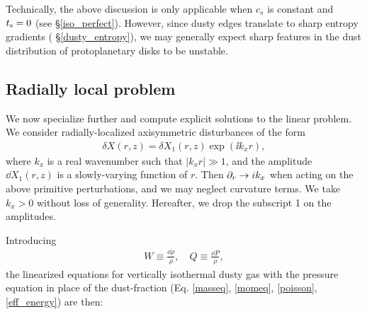Technically, the above discussion is only applicable when $c_s$ is
constant and $t_\mathrm{s}=0$ (see \S\ref{iso_perfect}). However, since
dusty edges translate to sharp entropy gradients (
\S\ref{dusty_entropy}), we may generally expect sharp features in the
dust distribution of protoplanetary disks to be unstable.    



\subsection{Radially local problem}
We now specialize further and compute explicit solutions to the linear
problem. We consider radially-localized axisymmetric disturbances of the form  
\begin{align}
  \delta X (r, z) = \delta X_1(r,z)\exp{(\ii k_x r)},
\end{align} 
where $k_x$ is a real wavenumber such that $|k_xr|\gg 1$, and the 
amplitude $\dd X_1(r,z)$ is 
a slowly-varying function of $r$. Then 
$\partial_r\to i k_x$ when acting on the above primitive perturbations, and we may
neglect curvature terms. We take  
$k_x>0$ without loss of generality. Hereafter, we drop the subscript 1
on the amplitudes. 

Introducing 
\begin{align}
  W \equiv \frac{\dd\rho}{\rho}, \quad Q \equiv \frac{\dd P}{\rho},
\end{align}
the linearized equations for 
vertically isothermal dusty gas with the pressure
equation in place of the dust-fraction
(Eq. \ref{masseq}, \ref{momeq}, \ref{poisson}, \ref{eff_energy}) are then:    

